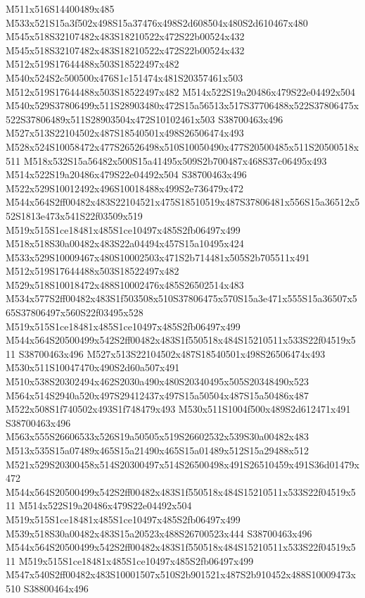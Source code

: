 \documentclass{article}
\begin{document}
\begin{multicols}{2}
M511x516S14400489x485 M533x521S15a3f502x498S15a37476x498S2d608504x480S2d610467x480 M545x518S32107482x483S18210522x472S22b00524x432 M545x518S32107482x483S18210522x472S22b00524x432 M512x519S17644488x503S18522497x482 M540x524S2c500500x476S1c151474x481S20357461x503 M512x519S17644488x503S18522497x482 M514x522S19a20486x479S22e04492x504 M540x529S37806499x511S28903480x472S15a56513x517S37706488x522S37806475x522S37806489x511S28903504x472S10102461x503 S38700463x496 M527x513S22104502x487S18540501x498S26506474x493 M528x524S10058472x477S26526498x510S10050490x477S20500485x511S20500518x511 M518x532S15a56482x500S15a41495x509S2b700487x468S37c06495x493 M514x522S19a20486x479S22e04492x504 S38700463x496 M522x529S10012492x496S10018488x499S2e736479x472 M544x564S2ff00482x483S22104521x475S18510519x487S37806481x556S15a36512x552S1813e473x541S22f03509x519 M519x515S1ce18481x485S1ce10497x485S2fb06497x499 M518x518S30a00482x483S22a04494x457S15a10495x424 M533x529S10009467x480S10002503x471S2b714481x505S2b705511x491 M512x519S17644488x503S18522497x482 M529x518S10018472x488S10002476x485S26502514x483 M534x577S2ff00482x483S1f503508x510S37806475x570S15a3e471x555S15a36507x565S37806497x560S22f03495x528 M519x515S1ce18481x485S1ce10497x485S2fb06497x499 M544x564S20500499x542S2ff00482x483S1f550518x484S15210511x533S22f04519x511 S38700463x496 M527x513S22104502x487S18540501x498S26506474x493 M530x511S10047470x490S2d60a507x491 M510x538S20302494x462S2030a490x480S20340495x505S20348490x523 M564x514S2940a520x497S29412437x497S15a50504x487S15a50486x487 M522x508S1f740502x493S1f748479x493 M530x511S1004f500x489S2d612471x491 S38700463x496 M563x555S26606533x526S19a50505x519S26602532x539S30a00482x483 M513x535S15a07489x465S15a21490x465S15a01489x512S15a29488x512 M521x529S20300458x514S20300497x514S26500498x491S26510459x491S36d01479x472 M544x564S20500499x542S2ff00482x483S1f550518x484S15210511x533S22f04519x511 M514x522S19a20486x479S22e04492x504 M519x515S1ce18481x485S1ce10497x485S2fb06497x499 M539x518S30a00482x483S15a20523x488S26700523x444 S38700463x496 M544x564S20500499x542S2ff00482x483S1f550518x484S15210511x533S22f04519x511 M519x515S1ce18481x485S1ce10497x485S2fb06497x499 M547x540S2ff00482x483S10001507x510S2b901521x487S2b910452x488S10009473x510 S38800464x496


\end{multicols}
\end{document}
